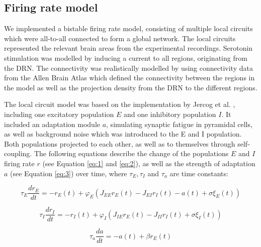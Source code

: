 \documentclass[11pt,a4paper,onecolumn]{article}
\begin{document}
\subsection*{Firing rate model}
We implemented a bistable firing rate model, consisting of multiple local circuits which were all-to-all connected to form a global network. The local circuits represented the relevant brain areas from the experimental recordings. Serotonin stimulation was modelled by inducing a current to all regions, originating from the DRN. The connectivity was realistically modelled by using connectivity data from the Allen Brain Atlas \citep{oh_mesoscale_2014, knox_high-resolution_2018} which defined the connectivity between the regions in the model as well as the projection density from the DRN to the different regions.  

The local circuit model was based on the implementation by Jercog et al. \citep{jercogUPDOWNCorticalDynamics2017}, including one excitatory population $E$ and one inhibitory population $I$. It included an adaptation module $a$, simulating synaptic fatigue in pyramidal cells, as well as background noise which was introduced to the E and I population. Both populations projected to each other, as well as to themselves through self-coupling. The following equations describe the change of the populations $E$ and $I$ firing rate $r$ (see Equation \ref{eq:1} and \ref{eq:2}), as well as the strength of adaptation $a$ (see Equation \ref{eq:3}) over time, where $\tau_E, \tau_I$ and $\tau_a$ are time constants:

\begin{equation}\label{eq:1}
    \tau_E \frac{dr_E}{dt} = -r_E(t) + \varphi_E (J_{EE}r_E(t) - J_{EI}r_I(t)-a(t)+\sigma\xi_E(t))
\end{equation}

\begin{equation}\label{eq:2}
    \tau_I \frac{dr_I}{dt} = -r_I(t) + \varphi_I (J_{IE}r_E(t) - J_{II}r_I(t)+\sigma\xi_I(t))
\end{equation}

\begin{equation}\label{eq:3}
    \tau_a \frac{da}{dt} = -a(t) + \beta r_E(t)
\end{equation}
\end{document}
